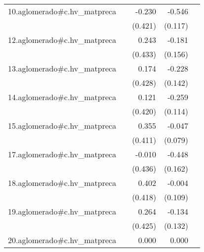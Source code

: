 {\begin{longtable}{l*{4}{D{.}{.}{-1}}}
\addlinespace
10.aglomerado#c.hv\_matpreca&                     &      -0.230         &      -0.546\sym{***}&                     \\
            &                     &     (0.421)         &     (0.117)         &                     \\
\addlinespace
12.aglomerado#c.hv\_matpreca&                     &       0.243         &      -0.181         &                     \\
            &                     &     (0.433)         &     (0.156)         &                     \\
\addlinespace
13.aglomerado#c.hv\_matpreca&                     &       0.174         &      -0.228         &                     \\
            &                     &     (0.428)         &     (0.142)         &                     \\
\addlinespace
14.aglomerado#c.hv\_matpreca&                     &       0.121         &      -0.259\sym{*}  &                     \\
            &                     &     (0.420)         &     (0.114)         &                     \\
\addlinespace
15.aglomerado#c.hv\_matpreca&                     &       0.355         &      -0.047         &                     \\
            &                     &     (0.411)         &     (0.079)         &                     \\
\addlinespace
17.aglomerado#c.hv\_matpreca&                     &      -0.010         &      -0.448\sym{**} &                     \\
            &                     &     (0.436)         &     (0.162)         &                     \\
\addlinespace
18.aglomerado#c.hv\_matpreca&                     &       0.402         &      -0.004         &                     \\
            &                     &     (0.418)         &     (0.109)         &                     \\
\addlinespace
19.aglomerado#c.hv\_matpreca&                     &       0.264         &      -0.134         &                     \\
            &                     &     (0.425)         &     (0.132)         &                     \\
\addlinespace
20.aglomerado#c.hv\_matpreca&                     &       0.000         &       0.000         &                     \\

\end{longtable}}
